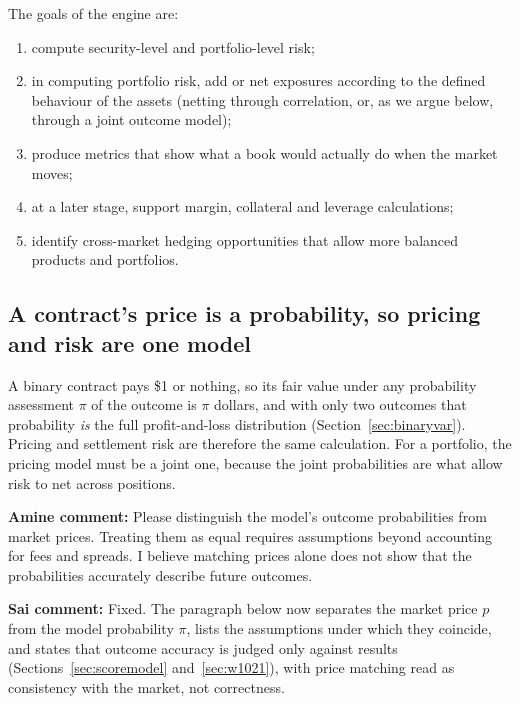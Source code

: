 \documentclass[11pt]{article}
\begin{document}
The goals of the engine are:
\begin{enumerate}[nosep]
\item compute security-level and portfolio-level risk;
\item in computing portfolio risk, add or net exposures according to the defined behaviour of the assets (netting through correlation, or, as we argue below, through a joint outcome model);
\item produce metrics that show what a book would actually do when the market moves;
\item at a later stage, support margin, collateral and leverage calculations;
\item identify cross-market hedging opportunities that allow more balanced products and portfolios.
\end{enumerate}

\subsection{A contract's price is a probability, so pricing and risk are one model}\label{sec:pricing}


A binary contract pays \$1 or nothing, so its fair value under any probability assessment $\pi$ of the outcome is $\pi$ dollars, and with only two outcomes that probability \emph{is} the full profit-and-loss distribution (Section~\ref{sec:binaryvar}). Pricing and settlement risk are therefore the same calculation. For a portfolio, the pricing model must be a joint one, because the joint probabilities are what allow risk to net across positions.

{\color{red}\textbf{Amine comment:} Please distinguish the model's outcome probabilities from market prices. Treating them as equal requires assumptions beyond accounting for fees and spreads. I believe matching prices alone does not show that the probabilities accurately describe future outcomes.}

{\color{blue}\textbf{Sai comment:} Fixed. The paragraph below now separates the market price $p$ from the model probability $\pi$, lists the assumptions under which they coincide, and states that outcome accuracy is judged only against results (Sections~\ref{sec:scoremodel} and~\ref{sec:w1021}), with price matching read as consistency with the market, not correctness.}
\end{document}
